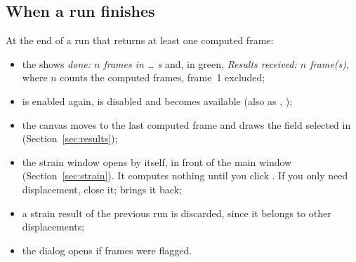 \subsection{When a run finishes}

At the end of a run that returns at least one computed frame:

\begin{itemize}
  \item the  shows \emph{done: $n$ frames in \ldots{} s} and, in green, \emph{Results
        received: $n$ frame(s)}, where $n$ counts the computed frames, frame~1 excluded;
  \item {} is enabled again,  is disabled and 
        becomes available (also as , );
  \item the canvas moves to the last computed frame and draws the field selected in 
        (Section~\ref{sec:results});
  \item the strain window opens by itself, in front of the main window
        (Section~\ref{sec:strain}). It computes nothing until you click . If
        you only need displacement, close it;  brings it back;
  \item a strain result of the previous run is discarded, since it belongs to other
        displacements;
  \item the  dialog opens if frames were flagged.
\end{itemize}
